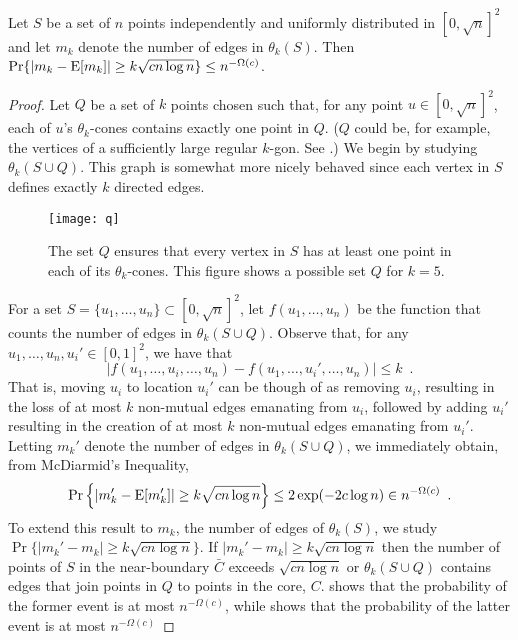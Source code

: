 \documentclass{patmorin}
\begin{document}
\begin{lem}
 Let $S$ be a set of $n$ points independently and uniformly distributed
 in $[0,\sqrt{n}]^2$ and let $m_k$ denote the number of edges in $\theta_k(S)$.
 Then $\Pr\{|m_k-\mathrm{E}[m_k]| \ge k\sqrt{cn\log n}\} \le n^{-\Omega(c)}$.
\end{lem}

\begin{proof}
Let $Q$ be a set of $k$ points chosen such that, for any point
$u\in[0,\sqrt{n}]^2$, each of $u$'s $\theta_k$-cones contains exactly
one point in $Q$. ($Q$ could be, for example, the vertices of a
sufficiently large regular $k$-gon. See .)  We begin by studying
$\theta_k(S\cup Q)$.  This graph is somewhat more nicely behaved since
each vertex in $S$ defines exactly $k$ directed edges.

\begin{figure}
  \begin{center}
    \texttt{[image: q]}
  \end{center}
  \caption{The set $Q$ ensures that every vertex in $S$ has at least
    one point in each of its $\theta_k$-cones.  This figure shows a
    possible set $Q$ for $k=5$.}
\end{figure}

For a set $S=\{u_1,\ldots,u_n\}\subset [0,\sqrt{n}]^2$, let
$f(u_1,\ldots,u_n)$ be the function that counts the number of edges
in $\theta_k(S\cup Q)$.  Observe that, for any $u_1,\ldots,u_n,u_i'\in
[0,1]^2$, we have that
\[
   |f(u_1,\ldots,u_i,\ldots,u_n)-f(u_1,\ldots,u_i',\ldots,u_n)| \le k \enspace .
\]
That is, moving $u_i$ to location $u_i'$ can be though of as removing
$u_i$, resulting in the loss of at most $k$ non-mutual edges emanating
from $u_i$, followed by adding $u_i'$ resulting in the creation of at
most $k$ non-mutual edges emanating from $u_i'$.  Letting $m_k'$ denote
the number of edges in $\theta_k(S\cup Q)$, we immediately obtain,
from McDiarmid's Inequality,
\[
   \Pr\left\{\left|m_k'-\mathrm{E}[m_k']\right| \ge k\sqrt{cn\log n}\right\} 
       \le 2\exp(-2c\log n) 
       \in n^{-\Omega(c)} \enspace .
\]
To extend this result to $m_k$, the number of edges of $\theta_k(S)$,
we study $\Pr\{|m_k' - m_k|\ge k\sqrt{cn\log n}\}$.  If $|m_k' - m_k|\ge
k\sqrt{cn\log n}$ then the number of points of $S$ in the near-boundary
$\bar{C}$ exceeds $\sqrt{cn\log n}$ or $\theta_k(S\cup Q)$ contains
edges that join points in $Q$ to points in the core, $C$.
 shows that the probability of the former event is at most
$n^{-\Omega(c)}$, while  shows that the probability of
the latter event is at most $n^{-\Omega(c)}$
\end{proof}
\end{document}
